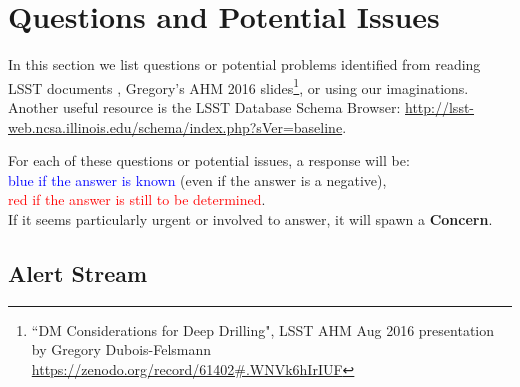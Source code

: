 \documentclass[DM,lsstdraft,toc]{lsstdoc}
\begin{document}
\clearpage
\section{Questions and Potential Issues}\label{sec:issues}

In this section we list questions or potential problems identified from reading LSST documents \citep{LSE-163,LDM-151}, Gregory's AHM 2016 slides\footnote{``DM Considerations for Deep Drilling", LSST AHM Aug 2016 presentation by Gregory Dubois-Felsmann \url{https://zenodo.org/record/61402\#.WNVk6hIrIUF}}, or using our imaginations. Another useful resource is the LSST Database Schema Browser: \url{http://lsst-web.ncsa.illinois.edu/schema/index.php?sVer=baseline}.

For each of these questions or potential issues, a response will be: \\
\textcolor{blue}{blue if the answer is known} (even if the answer is a negative), \\
\textcolor{red}{red if the answer is still to be determined}. \\
If it seems particularly urgent or involved to answer, it will spawn a \textbf{Concern}.


\subsection{Alert Stream}\label{ssec:issues_alerts}
\end{document}
